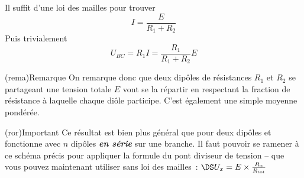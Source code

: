 \documentclass[../../main/main.tex]{subfiles}
\begin{document}
{\begin{tcbraster}[raster columns=3, raster equal height=rows]
\begin{tcb}
        Il suffit d'une loi des mailles pour trouver
        \[I = \frac{E}{R_1+R_2}\]
        Puis trivialement
        \[U_{BC} = R_1I = \frac{R_1}{R_1+R_2}E\]
    \end{tcb}
\end{tcbraster}
\begin{tcbraster}[raster columns=2, raster equal height=rows]
    \begin{tcb}(rema){Remarque}
        On remarque donc que deux dipôles de résistances $R_1$ et $R_2$ se
        partageant une tension totale $E$ vont se la répartir
        en respectant la fraction de résistance à laquelle chaque diôle
        participe. C'est également une simple moyenne pondérée.
    \end{tcb}
    \begin{tcb}(ror){Important}
        Ce résultat est bien plus général que pour deux dipôles et fonctionne
        avec $n$ dipôles \textbf{\textit{en série}} sur une branche. Il faut
        pouvoir se ramener à ce schéma précis pour appliquer la formule du pont
        diviseur de tension – que vous pouvez maintenant utiliser sans loi des
        mailles~: $\DS U_x = E\times \frac{R_x}{R_\mathrm{tot}}$
    \end{tcb}
\end{tcbraster}

}
\end{document}
